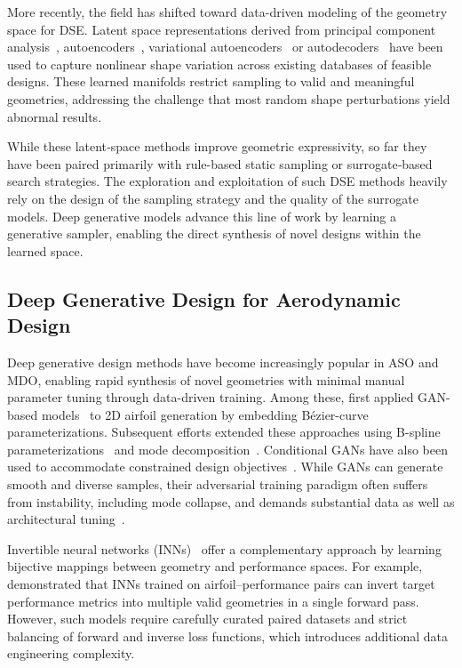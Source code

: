 More recently, the field has shifted toward data-driven modeling of the geometry space for DSE. Latent space representations derived from principal component analysis~\cite{aa.Robinson2001,aa.Poole2015,aa.Masters2017,aa.Li2019,aa.Li2021b}, autoencoders~\cite{aa.DAgostino2018,aa.Rios2021,aa.Li2020}, variational autoencoders~\cite{aa.Yonekura2021,aa.Kou2023,aa.Swannet2024,aa.Wang2022} or autodecoders~\cite{aa.Wei2023, aa.Wei2023b} have been used to capture nonlinear shape variation across existing databases of feasible designs. These learned manifolds restrict sampling to valid and meaningful geometries, addressing the challenge that most random shape perturbations yield abnormal results.

While these latent‐space methods improve geometric expressivity, so far they have been paired primarily with rule-based static sampling or surrogate‐based search strategies. The exploration and exploitation of such DSE methods heavily rely on the design of the sampling strategy and the quality of the surrogate models. Deep generative models advance this line of work by learning a generative sampler, enabling the direct synthesis of novel designs within the learned space.

\subsection{Deep Generative Design for Aerodynamic Design}

Deep generative design methods have become increasingly popular in ASO and MDO, enabling rapid synthesis of novel geometries with minimal manual parameter tuning through data-driven training. Among these, \citet{aa.Chen2020} first applied GAN-based models~\cite{ai.Goodfellow2020} to 2D airfoil generation by embedding Bézier-curve parameterizations. Subsequent efforts extended these approaches using B-spline parameterizations~\cite{aa.Du2020} and mode decomposition~\cite{aa.Li2020,aa.Li2021}. Conditional GANs have also been used to accommodate constrained design objectives~\cite{aa.Achour2020,aa.Wang2022,aa.Lei2021}. While GANs can generate smooth and diverse samples, their adversarial training paradigm often suffers from instability, including mode collapse, and demands substantial data as well as architectural tuning~\cite{ai.Arjovsky2017}.

Invertible neural networks (INNs)~\cite{ai.Dinh2015,ai.Dinh2017} offer a complementary approach by learning bijective mappings between geometry and performance spaces. For example, \citet{aa.Glaws2022} demonstrated that INNs trained on airfoil–performance pairs can invert target performance metrics into multiple valid geometries in a single forward pass. However, such models require carefully curated paired datasets and strict balancing of forward and inverse loss functions, which introduces additional data engineering complexity.

